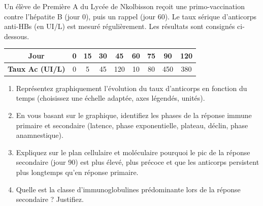 \documentclass[11pt]{article}
\begin{document}
\begin{exercice}
Un élève de Première A du Lycée de Nkolbisson reçoit une primo-vaccination contre l'hépatite B (jour 0), puis un rappel (jour 60). Le taux sérique d'anticorps anti-HBs (en UI/L) est mesuré régulièrement. Les résultats sont consignés ci-dessous.

\begin{tabular}{|c|c|c|c|c|c|c|c|c|}
\hline
\textbf{Jour} & 0 & 15 & 30 & 45 & 60 & 75 & 90 & 120 \\
\hline
\textbf{Taux Ac (UI/L)} & 0 & 5 & 45 & 120 & 10 & 80 & 450 & 380 \\
\hline
\end{tabular}

\begin{enumerate}
    \item Représentez graphiquement l'évolution du taux d'anticorps en fonction du temps (choisissez une échelle adaptée, axes légendés, unités).
    \item En vous basant sur le graphique, identifiez les phases de la réponse immune primaire et secondaire (latence, phase exponentielle, plateau, déclin, phase anamnestique).
    \item Expliquez sur le plan cellulaire et moléculaire pourquoi le pic de la réponse secondaire (jour 90) est plus élevé, plus précoce et que les anticorps persistent plus longtemps qu'en réponse primaire.
    \item Quelle est la classe d'immunoglobulines prédominante lors de la réponse secondaire ? Justifiez.
\end{enumerate}
\end{exercice}
\end{document}
